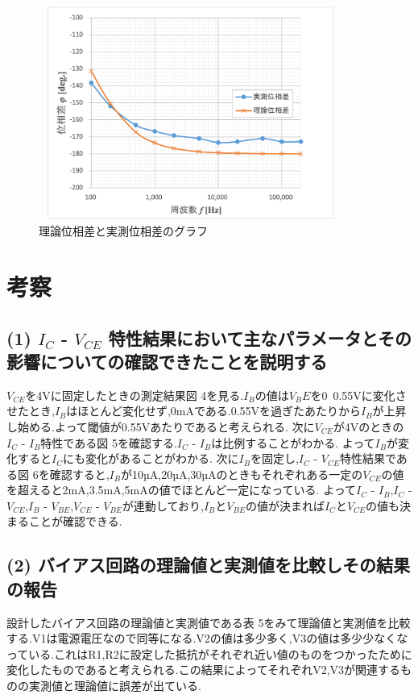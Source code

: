 \documentclass[a4j,10pt,dvipdfmx]{jarticle}
\begin{document}
\begin{figure}[H]
  \label{syuha}
  \begin{center}
  \includegraphics[height=7cm,width=10cm]{syuhasu.png}
  \caption{理論位相差と実測位相差のグラフ}
\end{center}
\end{figure}
\section{考察}
\subsection{(1) $I_C$ - $V_{CE}$ 特性結果において主なパラメータとその影響についての確認できたことを説明する}
$V_{CE}$を4Vに固定したときの測定結果図 4を見る.$I_B$の値は$V_BE$を0~0.55Vに変化させたとき,$I_B$はほとんど変化せず,0mAである.0.55Vを過ぎたあたりから$I_B$が上昇し始める.よって閾値が0.55Vあたりであると考えられる.
次に$V_{CE}$が4Vのときの$I_C$ - $I_B$特性である図 5を確認する.$I_C$ - $I_B$は比例することがわかる.
よって$I_B$が変化すると$I_C$にも変化があることがわかる.
次に$I_B$を固定し,$I_C$ - $V_{CE}$特性結果である図 6を確認すると,$I_B$が10µA,20µA,30µAのときもそれぞれある一定の$V_{CE}$の値を超えると2mA,3.5mA,5mAの値でほとんど一定になっている.
よって$I_C$ - $I_B$,$I_C$ - $V_{CE}$,$I_B$ - $V_{BE}$,$V_{CE}$ - $V_{BE}$が連動しており,$I_B$と$V_{BE}$の値が決まれば$I_C$と$V_{CE}$の値も決まることが確認できる.
\subsection{(2) バイアス回路の理論値と実測値を比較しその結果の報告}
設計したバイアス回路の理論値と実測値である表 5をみて理論値と実測値を比較する.V1は電源電圧なので同等になる.V2の値は多少多く,V3の値は多少少なくなっている.これはR1,R2に設定した抵抗がそれぞれ近い値のものをつかったために変化したものであると考えられる.この結果によってそれぞれV2,V3が関連するものの実測値と理論値に誤差が出ている.
\end{document}
